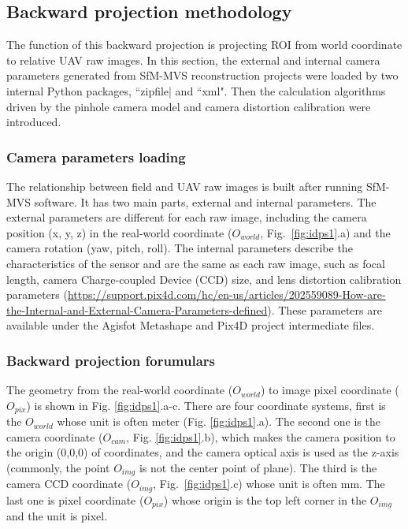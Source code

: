 \subsection{Backward projection methodology}
\label{spp:backward}

% 

The function of this backward projection is projecting ROI from world coordinate to relative UAV raw images. In this section, the external and internal camera parameters generated from SfM-MVS reconstruction projects were loaded by two internal Python packages, ``zipfile| and ``xml". Then the calculation algorithms driven by the pinhole camera model and camera distortion calibration were introduced.

\subsubsection*{Camera parameters loading}

The relationship between field and UAV raw images is built after running SfM-MVS software. It has two main parts, external and internal parameters. The external parameters are different for each raw image, including the camera position (x, y, z) in the real-world coordinate ($O_{world}$, Fig.~\ref{fig:idps1}.a) and the camera rotation (yaw, pitch, roll). The internal parameters describe the characteristics of the sensor and are the same as each raw image, such as focal length, camera Charge-coupled Device (CCD) size, and lens distortion calibration parameters (\url{https://support.pix4d.com/hc/en-us/articles/202559089-How-are-the-Internal-and-External-Camera-Parameters-defined}). These parameters are available under the Agisfot Metashape and Pix4D project intermediate files.



\subsubsection*{Backward projection forumulars}

The geometry from the real-world coordinate ($O_{world}$) to image pixel coordinate ($O_{pix}$) is shown in Fig. \ref{fig:idps1}.a-c. There are four coordinate systems, first is the $O_{world}$ whose unit is often meter (Fig. \ref{fig:idps1}.a). The second one is the camera coordinate ($O_{cam}$, Fig. \ref{fig:idps1}.b), which makes the camera position to the origin (0,0,0) of coordinates, and the camera optical axis is used as the z-axis (commonly, the point $O_{img}$ is not the center point of plane). The third is the camera CCD coordinate ($O_{img}$, Fig.~\ref{fig:idps1}.c) whose unit is often mm. The last one is pixel coordinate ($O_{pix}$) whose origin is the top left corner in the $O_{img}$ and the unit is pixel.

